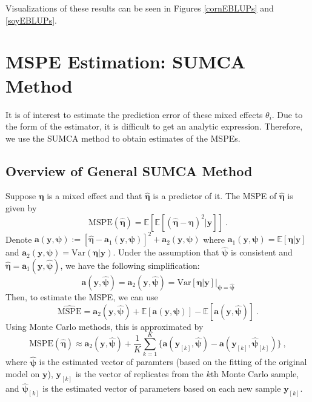 \documentclass{article}
\begin{document}
Visualizations of these results can be seen in Figures \ref{cornEBLUPs} and \ref{soyEBLUPs}.

\section{MSPE Estimation: SUMCA Method}

It is of interest to estimate the prediction error of these mixed effects $\theta_i$. Due to the form of the estimator, it is difficult to get an analytic expression. Therefore, we use the SUMCA method to obtain estimates of the MSPEs.

\subsection{Overview of General SUMCA Method}

Suppose $\boldsymbol\eta$ is a mixed effect and that $\hat{\boldsymbol\eta}$ is a predictor of it. The MSPE of $\hat{\boldsymbol\eta}$ is given by
\[
\text{MSPE}(\hat{\boldsymbol\eta})=\mathbb E[\mathbb E[(\hat{\boldsymbol\eta}-\boldsymbol\eta)^2|\mathbf y]]\ .
\]
Denote $\mathbf a(\mathbf y,\boldsymbol\psi):=[\hat{\boldsymbol\eta}-\mathbf a_1(\mathbf y,\boldsymbol\psi)]^2+\mathbf a_2(\mathbf y,\boldsymbol\psi)$ where $\mathbf a_1(\mathbf y,\boldsymbol\psi)=\mathbb E[\boldsymbol\eta|\mathbf y]$ and $\mathbf a_2(\mathbf y,\boldsymbol\psi)=\text{Var}(\boldsymbol\eta|\mathbf y)$. Under the assumption that $\hat{\boldsymbol\psi}$ is consistent and $\hat{\boldsymbol\eta}=\mathbf a_1(\mathbf y,\hat{\boldsymbol\psi})$, we have the following simplification:
\[
\mathbf a(\mathbf y,\hat{\boldsymbol\psi}) = \mathbf a_2(\mathbf y,\hat{\boldsymbol\psi}) = \text{Var}[\boldsymbol\eta|\mathbf y]\vert_{\boldsymbol\psi=\hat{\boldsymbol\psi}}
\]
Then, to estimate the MSPE, we can use
\[
\widehat{\text{MSPE}} = \mathbf a_2(\mathbf y,\hat{\boldsymbol\psi})+\mathbb E[\mathbf a(\mathbf y,\boldsymbol\psi)]-\mathbb E[\mathbf a(\mathbf y,\hat{\boldsymbol\psi})]\ .
\]
Using Monte Carlo methods, this is approximated by
\[
\text{MSPE}(\hat{\boldsymbol\eta})\approx\mathbf a_2(\mathbf y,\hat{\boldsymbol\psi}) + \frac{1}{K}\sum_{k=1}^{K} \{\mathbf a(\mathbf y_{[k]},\hat{\boldsymbol\psi})-\mathbf a(\mathbf y_{[k]},\hat{\boldsymbol\psi}_{[k]})\}\ ,
\]
where $\hat{\boldsymbol\psi}$ is the estimated vector of paramters (based on the fitting of the original model on $\mathbf y$), $\mathbf y_{[k]}$ is the vector of replicates from the $k$th Monte Carlo sample, and $\hat{\boldsymbol\psi}_{[k]}$ is the estimated vector of parameters based on each new sample $\mathbf y_{[k]}$.
\medbreak
\end{document}

